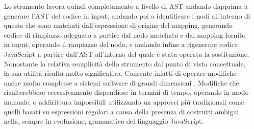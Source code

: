 Lo strumento lavora quindi completamente a livello di AST andando dapprima a
generare l’AST del codice in input, andando poi a identificare i nodi
all’interno di questo che sono matchati dall’espressione di origine del mapping,
generando codice di rimpiazzo adeguato a partire dal nodo matchato e dal mapping
fornito in input, operando il rimpiazzo del nodo, e andando infine a rigenerare
codice JavaScript a partire dall’AST all’interno del quale è stata operata la
sostituzione.\\

Nonostante la relativa semplicità dello strumento dal punto di vista
concettuale, la sua utilità risulta molto significativa. Consente infatti di
operare modifiche anche molto complesse a sistemi software di grandi dimensioni
\cite{jsconf2016}. Modifiche che risulterebbero eccessivamente dispendiose in
termini di tempo, operando in modo manuale, o addirittura impossibili
utilizzando un approcci più tradizionali come quelli basati su espressioni
regolari a causa della presenza di costrutti ambigui nella, sempre in
evoluzione, grammatica del linguaggio JavaScript.\\


